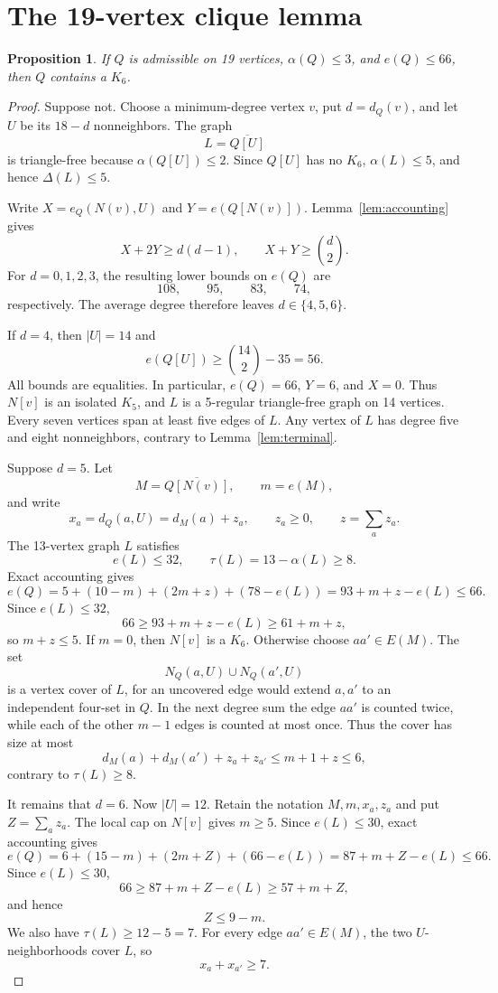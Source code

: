\documentclass[11pt,reqno,a4paper]{amsart}
\newtheorem{proposition}[theorem]{Proposition}
\theoremstyle{definition}
\theoremstyle{remark}
\newcommand{\comp}[1]{\overline{#1}}
\begin{document}
\section{The 19-vertex clique lemma}

\begin{proposition}\label{prop:Q19}
If $Q$ is admissible on 19 vertices, $\alpha(Q)\leq3$, and $e(Q)\leq66$,
then $Q$ contains a $K_6$.
\end{proposition}

\begin{proof}
Suppose not.  Choose a minimum-degree vertex $v$, put $d=d_Q(v)$, and let
$U$ be its $18-d$ nonneighbors.  The graph
\[
  L=\comp{Q[U]}
\]
is triangle-free because $\alpha(Q[U])\leq2$.  Since $Q[U]$ has no $K_6$,
$\alpha(L)\leq5$, and hence $\Delta(L)\leq5$.

Write $X=e_Q(N(v),U)$ and $Y=e(Q[N(v)])$.  Lemma~\ref{lem:accounting}
gives
\[
  X+2Y\geq d(d-1),
  \qquad X+Y\geq\binom d2.
\]
For $d=0,1,2,3$, the resulting lower bounds on $e(Q)$ are
\[
  108,\qquad95,\qquad83,\qquad74,
\]
respectively.  The average degree therefore leaves $d\in\{4,5,6\}$.

If $d=4$, then $|U|=14$ and
\[
  e(Q[U])\geq\binom{14}{2}-35=56.
\]
All bounds are equalities.  In particular, $e(Q)=66$, $Y=6$, and $X=0$.
Thus $N[v]$ is an isolated $K_5$, and $L$ is a 5-regular triangle-free
graph on 14 vertices.  Every seven vertices span at least five edges of
$L$.  Any vertex of $L$ has degree five and eight nonneighbors, contrary to
Lemma~\ref{lem:terminal}.

Suppose $d=5$.  Let
\[
  M=\comp{Q[N(v)]},\qquad m=e(M),
\]
and write
\[
  x_a=d_Q(a,U)=d_M(a)+z_a,
  \qquad z_a\geq0,\qquad z=\sum_a z_a.
\]
The 13-vertex graph $L$ satisfies
\[
  e(L)\leq32,
  \qquad \tau(L)=13-\alpha(L)\geq8.
\]
Exact accounting gives
\[
  e(Q)=5+(10-m)+(2m+z)+(78-e(L))
      =93+m+z-e(L)\leq66.
\]
Since $e(L)\leq32$,
\[
  66\geq93+m+z-e(L)\geq61+m+z,
\]
so $m+z\leq5$.  If $m=0$, then $N[v]$ is a $K_6$.  Otherwise
choose $aa'\in E(M)$.  The set
\[
  N_Q(a,U)\cup N_Q(a',U)
\]
is a vertex cover of $L$, for an uncovered edge would extend $a,a'$ to an
independent four-set in $Q$.  In the next degree sum the edge $aa'$ is
counted twice, while each of the other $m-1$ edges is counted at most once.
Thus the cover has size at most
\[
  d_M(a)+d_M(a')+z_a+z_{a'}
  \leq m+1+z\leq6,
\]
contrary to $\tau(L)\geq8$.

It remains that $d=6$.  Now $|U|=12$.  Retain the notation $M,m,x_a,z_a$
and put $Z=\sum_a z_a$.  The local cap on $N[v]$ gives $m\geq5$.  Since
$e(L)\leq30$, exact accounting gives
\[
  e(Q)=6+(15-m)+(2m+Z)+(66-e(L))
      =87+m+Z-e(L)\leq66.
\]
Since $e(L)\leq30$,
\[
  66\geq87+m+Z-e(L)\geq57+m+Z,
\]
and hence
\begin{equation}\label{eq:Q19-budget}
  Z\leq9-m.
\end{equation}
We also have $\tau(L)\geq12-5=7$.  For every edge $aa'\in E(M)$, the two
$U$-neighborhoods cover $L$, so
\begin{equation}\label{eq:Q19-weight}
  x_a+x_{a'}\geq7.
\end{equation}


\end{proof}
\end{document}
